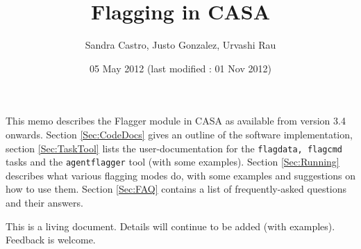 \documentclass[11pt]{article}
\begin{document}
\title{Flagging in CASA}
\author{Sandra Castro, Justo Gonzalez, Urvashi Rau}
\date{05 May 2012 (last modified : 01 Nov 2012)}
\maketitle

This memo describes the Flagger module in CASA as available from version 3.4 onwards. Section \ref{Sec:CodeDocs} gives an outline of the software implementation, section \ref{Sec:TaskTool} lists the user-documentation for the {\tt flagdata, flagcmd} tasks and the {\tt agentflagger} tool (with some examples).  Section \ref{Sec:Running} describes what various flagging modes do, with some examples and suggestions on how to use them. Section \ref{Sec:FAQ} contains a list of frequently-asked questions and their answers.

This is a living document. Details will continue to be added (with examples). Feedback is welcome.

\tableofcontents




\end{document}
